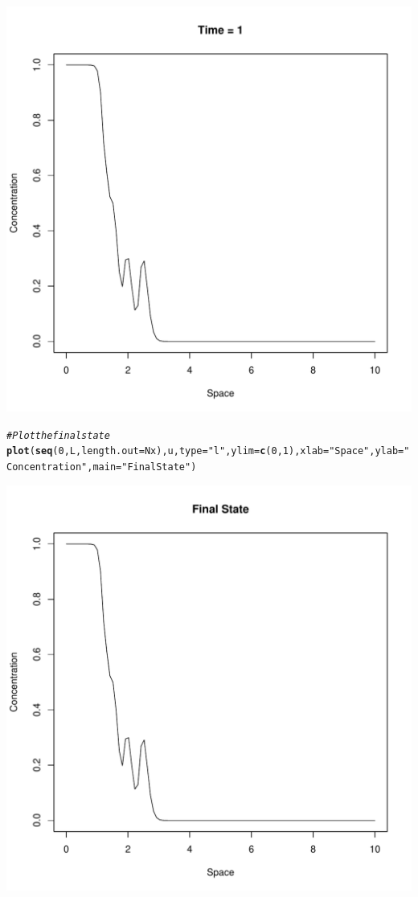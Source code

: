 \documentclass{tufte-handout}\usepackage[]{graphicx}\usepackage[]{xcolor}
\makeatletter
\def\maxwidth{ %
  \ifdim\Gin@nat@width>\linewidth
    \linewidth
  \else
    \Gin@nat@width
  \fi
}
\newcommand{\hlnum}[1]{\textcolor[rgb]{0.686,0.059,0.569}{#1}}%
\newcommand{\hlstr}[1]{\textcolor[rgb]{0.192,0.494,0.8}{#1}}%
\newcommand{\hlcom}[1]{\textcolor[rgb]{0.678,0.584,0.686}{\textit{#1}}}%
\newcommand{\hlstd}[1]{\textcolor[rgb]{0.345,0.345,0.345}{#1}}%
\newcommand{\hlkwc}[1]{\textcolor[rgb]{0.333,0.667,0.333}{#1}}%
\newcommand{\hlkwd}[1]{\textcolor[rgb]{0.737,0.353,0.396}{\textbf{#1}}}%
\newenvironment{kframe}{%
 \def\at@end@of@kframe{}%
 \ifinner\ifhmode%
  \def\at@end@of@kframe{\end{minipage}}%
  \begin{minipage}{\columnwidth}%
 \fi\fi%
 \def\FrameCommand##1{\hskip\@totalleftmargin \hskip-\fboxsep
 \colorbox{shadecolor}{##1}\hskip-\fboxsep
     \hskip-\linewidth \hskip-\@totalleftmargin \hskip\columnwidth}%
 \MakeFramed {\advance\hsize-\width
   \@totalleftmargin\z@ \linewidth\hsize
   \@setminipage}}%
 {\par\unskip\endMakeFramed%
 \at@end@of@kframe}
\newenvironment{knitrout}{}{} %
\makeatother
\begin{document}
\begin{knitrout}
\includegraphics[width=\maxwidth]{figure/unnamed-chunk-2-11} 
\begin{kframe}\begin{alltt}
\hlcom{# Plot the final state}
\hlkwd{plot}\hlstd{(}\hlkwd{seq}\hlstd{(}\hlnum{0}\hlstd{, L,} \hlkwc{length.out} \hlstd{= Nx), u,} \hlkwc{type} \hlstd{=} \hlstr{"l"}\hlstd{,} \hlkwc{ylim} \hlstd{=} \hlkwd{c}\hlstd{(}\hlnum{0}\hlstd{,} \hlnum{1}\hlstd{),} \hlkwc{xlab} \hlstd{=} \hlstr{"Space"}\hlstd{,} \hlkwc{ylab} \hlstd{=} \hlstr{"Concentration"}\hlstd{,} \hlkwc{main} \hlstd{=} \hlstr{"Final State"}\hlstd{)}
\end{alltt}
\end{kframe}
\includegraphics[width=\maxwidth]{figure/unnamed-chunk-2-12} 
\end{knitrout}
\end{document}
